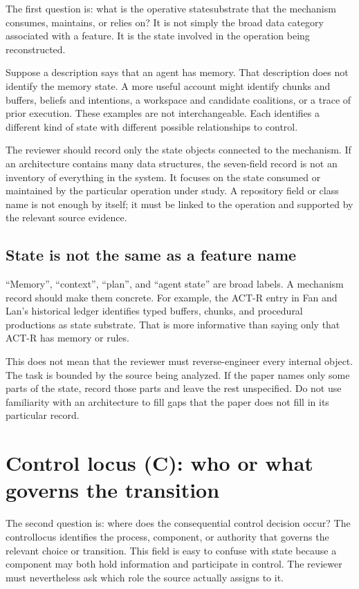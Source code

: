 The first question is: what is the operative \gls{statesubstrate} that the mechanism consumes, maintains, or relies on? It is not simply the broad data category associated with a feature. It is the state involved in the operation being reconstructed.

Suppose a description says that an agent has memory. That description does not identify the memory state. A more useful account might identify chunks and buffers, beliefs and intentions, a workspace and candidate coalitions, or a trace of prior execution. These examples are not interchangeable. Each identifies a different kind of state with different possible relationships to control.

The reviewer should record only the state objects connected to the mechanism. If an architecture contains many data structures, the seven-field record is not an inventory of everything in the system. It focuses on the state consumed or maintained by the particular operation under study. A repository field or class name is not enough by itself; it must be linked to the operation and supported by the relevant source evidence.

\subsection{State is not the same as a feature name}

``Memory'', ``context'', ``plan'', and ``agent state'' are broad labels. A mechanism record should make them concrete. For example, the ACT-R entry in Fan and Lan's historical ledger identifies typed buffers, chunks, and procedural productions as state substrate. That is more informative than saying only that ACT-R has memory or rules.

This does not mean that the reviewer must reverse-engineer every internal object. The task is bounded by the source being analyzed. If the paper names only some parts of the state, record those parts and leave the rest unspecified. Do not use familiarity with an architecture to fill gaps that the paper does not fill in its particular record.

\section{Control locus (C): who or what governs the transition}
\label{sec:field-control}

The second question is: where does the consequential control decision occur? The \gls{controllocus} identifies the process, component, or authority that governs the relevant choice or transition. This field is easy to confuse with state because a component may both hold information and participate in control. The reviewer must nevertheless ask which role the source actually assigns to it.


